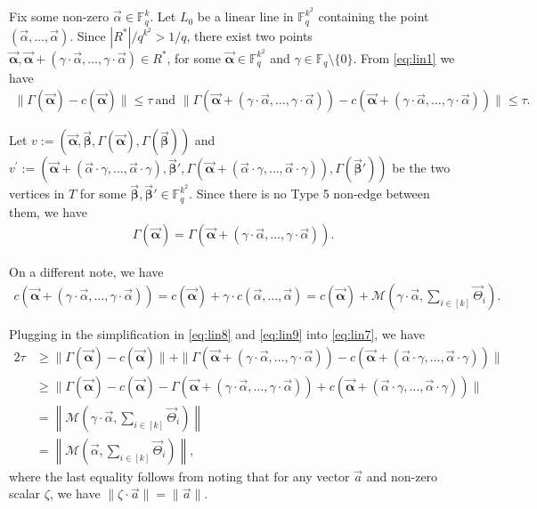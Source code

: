 \documentclass[10pt,a4paper]{article}
\newcommand{\F}{\mathbb{F}}
\renewcommand{\ge}{ \geqslant}
\renewcommand{\le}{ \leqslant}
\newcommand{\alphab}{\vec{\bm{\alpha}}}
\newcommand{\betab}{\vec{\bm{\beta}}}
\renewcommand{\kappa}{\tau}
\newcommand{\M}{\mathcal{M}}
\begin{document}
Fix some non-zero $\vec{\alpha}\in \F_q^k$.   Let $L_0$ be a linear line in $\F_q^{k^2}$  containing   the point $(\vec{\alpha},\ldots ,\vec{\alpha})$. Since $|{R}^\ast|/q^{k^2}>1/q$,  there exist two points  $\vec{\bm{\alpha}},\vec{\bm{\alpha}}+(\gamma\cdot \vec{\alpha},\ldots ,\gamma\cdot\vec{\alpha})\in {R}^\ast$, for some $\alphab\in\F_q^{k^2}$ and $\gamma\in \F_q\setminus\{0\}$. 
  From \eqref{eq:lin1} we have
\begin{align}
\|\Gamma(\vec{\bm{\alpha}})-c(\vec{\bm{\alpha}})\|\le \kappa\ \text{and } \|\Gamma(\vec{\bm{\alpha}}+(\gamma\cdot \vec{\alpha},\ldots ,\gamma\cdot\vec{\alpha}))-c(\vec{\bm{\alpha}}+(\gamma\cdot \vec{\alpha},\ldots ,\gamma\cdot\vec{\alpha}))\|\le \kappa. 
\label{eq:lin7}
\end{align}

Let $v:=(\alphab,\betab,\Gamma(\alphab),\Gamma(\betab))$ and 
$v^{\prime}:=(\alphab+(\vec{\alpha}\cdot\gamma,\ldots ,\vec{\alpha}\cdot\gamma),\betab',\Gamma(\alphab+(\vec{\alpha}\cdot\gamma,\ldots ,\vec{\alpha}\cdot\gamma)),\Gamma(\betab'))$ be the two vertices in $T$ for some $\betab,\betab'\in\F_q^{k^2}$. Since   there is no Type 5 non-edge between them, we have 
\begin{align}
\Gamma(\alphab)=\Gamma(\alphab+(\gamma\cdot \vec{\alpha},\ldots ,\gamma\cdot\vec{\alpha})).\label{eq:lin8}
\end{align}




On a different note, we have
\begin{align}
c(\vec{\bm{\alpha}}+(\gamma\cdot \vec{\alpha},\ldots ,\gamma\cdot\vec{\alpha}))=c(\vec{\bm{\alpha}})+\gamma\cdot c(\vec{\alpha},\ldots ,\vec{\alpha})=c(\vec{\bm{\alpha}})+\M\left(\gamma\cdot \vec{\alpha},\underset{i\in[k]}{\sum}\vec{\Theta}_i\right).
\label{eq:lin9}
\end{align}

Plugging in the simplification in \eqref{eq:lin8} and \eqref{eq:lin9} into \eqref{eq:lin7}, we have
\allowdisplaybreaks
\begin{align}
2\kappa&\ge\|\Gamma(\vec{\bm{\alpha}})-c(\vec{\bm{\alpha}})\|+\|\Gamma(\vec{\bm{\alpha}}+(\gamma\cdot \vec{\alpha},\ldots ,\gamma\cdot\vec{\alpha}))-c(\vec{\bm{\alpha}}+(\vec{\alpha}\cdot\gamma,\ldots ,\vec{\alpha}\cdot\gamma))\|\nonumber\\
&\ge\|\Gamma(\vec{\bm{\alpha}})-c(\vec{\bm{\alpha}})-\Gamma(\vec{\bm{\alpha}}+(\gamma\cdot \vec{\alpha},\ldots ,\gamma\cdot\vec{\alpha}))+c(\vec{\bm{\alpha}}+(\vec{\alpha}\cdot\gamma,\ldots ,\vec{\alpha}\cdot\gamma))\|\nonumber\\
&=\left\|\M\left(\gamma\cdot \vec{\alpha},\underset{i\in[k]}{\sum}\vec{\Theta}_i\right) \right\|\nonumber\\
&=\left\|\M\left( \vec{\alpha},\underset{i\in[k]}{\sum}\vec{\Theta}_i\right)\right\|\label{eqzero},
\end{align}
 where the last equality follows from noting that for any vector $\vec{a}$ and non-zero scalar $\zeta$, we have $\|\zeta\cdot \vec{a}\|=\|\vec{a}\|$.
 
\end{document}

